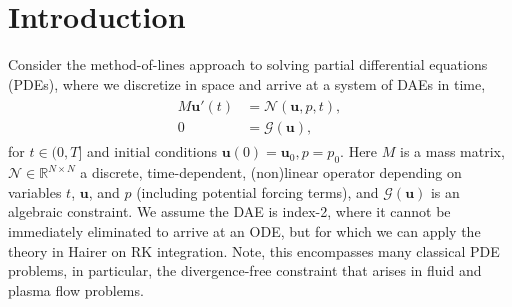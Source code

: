 \documentclass[a4paper,10pt]{article}
\begin{document}
\allowdisplaybreaks

\section{Introduction}

Consider the method-of-lines approach to solving partial differential equations (PDEs),
where we discretize in space and arrive at a system of DAEs in time,
%
\begin{align}\label{eq:problem}
\begin{split}
	M\mathbf{u}'(t) & =  \mathcal{N}(\mathbf{u},p,t), \\ 
	{0} & = \mathcal{G}(\mathbf{u}),
\end{split}
\end{align}
%
for $t\in(0,T]$ and initial conditions $\mathbf{u}(0) = \mathbf{u}_0, p= p_0$.
Here $M$ is a mass matrix, $\mathcal{N}\in\mathbb{R}^{N\times N}$ a discrete,
time-dependent, (non)linear operator depending on variables $t$, $\mathbf{u}$,
and $p$ (including potential forcing terms), and $\mathcal{G}(\mathbf{u})$ is
an algebraic constraint. We assume the DAE is index-2, where it cannot be
immediately eliminated to arrive at an ODE, but for which we can apply the
theory in Hairer on RK integration. Note, this encompasses many classical PDE
problems, in particular, the divergence-free constraint that arises in fluid
and plasma flow problems.
\end{document}
